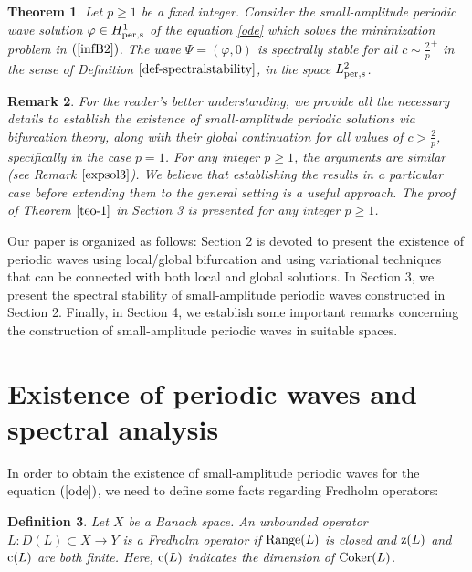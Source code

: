\documentclass[12pt,reqno,a4paper]{amsart} %
\numberwithin{equation}{section}
\numberwithin{figure}{section}
\newtheorem{theorem}{Theorem}[section]
\newtheorem{remark}[theorem]{Remark}
\newtheorem{definition}[theorem]{Definition}
\begin{document}
\begin{theorem}\label{teo-1}
	 Let $p\geq1$ be a fixed integer. Consider the small-amplitude periodic wave solution $\varphi\in H^1_{\rm per,s}$ of the equation \eqref{ode} which solves the minimization problem in $(\ref{infB2})$. The wave $\Psi = (\varphi, 0)$ is spectrally stable for all $c\sim\frac{2}{p}^{+}$ in the sense of Definition $\ref{def-spectralstability}$, in the space $L_{\rm per,s}^2$.\end{theorem}
\begin{remark}\label{remexpl} For the reader’s better understanding, we provide all the necessary details to establish the existence of small-amplitude periodic solutions via bifurcation theory, along with their global continuation for all values of $c > \frac{2}{p}$, specifically in the case $p = 1$. For any integer $p\geq 1$, the arguments are similar (see Remark $\ref{expsol3}$). We believe that establishing the results in a particular case before extending them to the general setting is a useful approach. The proof of Theorem $\ref{teo-1}$ in Section 3 is presented for any integer $p \geq 1$.
\end{remark}
\indent Our paper is organized as follows: Section 2 is devoted to present the existence of periodic waves using local/global bifurcation and using variational techniques that can be connected with both local and global solutions. In Section 3, we present the spectral stability of small-amplitude periodic waves constructed in Section 2. Finally, in Section 4, we establish some important remarks concerning the construction of small-amplitude periodic waves in suitable spaces.\\






			
			\section{Existence of periodic waves and spectral analysis}
			 In order to obtain the existence of small-amplitude periodic waves for the equation $(\ref{ode})$, we need to define some facts regarding Fredholm operators:
			
			\begin{definition}\label{def1} Let $X$ be a Banach space. An unbounded operator $L:D(L)\subset X\rightarrow Y$ is a Fredholm operator if ${\rm{Range}}(L)$ is closed and ${\rm{z}}(L)$ and ${\rm{c}}(L)$ are both finite. Here, ${\rm c}(L)$ indicates the dimension of ${\rm Coker}(L)$. 
			\end{definition}
			
\end{document}
